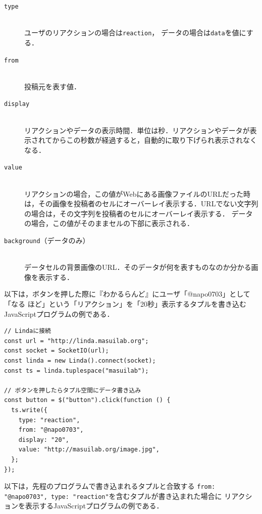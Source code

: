 \vspace{2mm}
\begin{description}
\item[\texttt{type}]\mbox{}\\
ユーザのリアクションの場合は\texttt{reaction}，
データの場合は\texttt{data}を値にする．

\item[\texttt{from}]\mbox{}\\
投稿元を表す値．

\item[\texttt{display}]\mbox{}\\
リアクションやデータの表示時間．単位は秒．リアクションやデータが表示されてからこの秒数が経過すると，自動的に取り下げられ表示されなくなる．

\item[\texttt{value}]\mbox{}\\
リアクションの場合，この値がWebにある画像ファイルのURLだった時は，その画像を投稿者のセルにオーバーレイ表示する．URLでない文字列の場合は，その文字列を投稿者のセルにオーバーレイ表示する．
データの場合，この値がそのままセルの下部に表示される．

\item[\texttt{background}（データのみ）]\mbox{}\\
データセルの背景画像のURL．そのデータが何を表すものなのか分かる画像を表示する．
\end{description}
\vspace{4mm}

以下は，ボタンを押した際に『わかるらんど』にユーザ「@napo0703」として「なる ほど」という「リアクション」を「20秒」表示するタプルを書き込むJavaScriptプログラムの例である．

\vspace{2mm}
\begin{lstlisting}
// Lindaに接続
const url = "http://linda.masuilab.org";
const socket = SocketIO(url);
const linda = new Linda().connect(socket);
const ts = linda.tuplespace("masuilab");

// ボタンを押したらタプル空間にデータ書き込み
const button = $("button").click(function () {
  ts.write({
    type: "reaction",
    from: "@napo0703",
    display: "20",
    value: "http://masuilab.org/image.jpg",
  };
});
\end{lstlisting}

以下は，先程のプログラムで書き込まれるタプルと合致する
\texttt{{from: "@napo0703", type: "reaction"}}を含むタプルが書き込まれた場合に
リアクションを表示するJavaScriptプログラムの例である．

